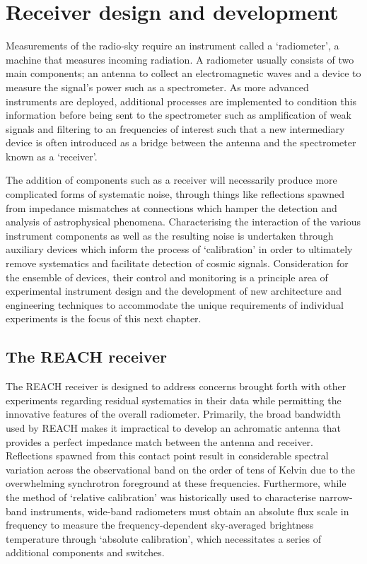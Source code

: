 \chapter{Receiver design and development}

\ifpdf
    \graphicspath{{Chapter3/Figs/Raster/}{Chapter3/Figs/PDF/}{Chapter3/Figs/}}
\else
    \graphicspath{{Chapter3/Figs/Vector/}{Chapter3/Figs/}}
\fi

Measurements of the radio-sky require an instrument called a ‘radiometer’, a machine that measures incoming radiation. A radiometer usually consists of two main components; an antenna to collect an electromagnetic waves and a device to measure the signal's power such as a spectrometer. As more advanced instruments are deployed, additional processes are implemented to condition this information before being sent to the spectrometer such as amplification of weak signals and filtering to an frequencies of interest such that a new intermediary device is often introduced as a bridge between the antenna and the spectrometer known as a ‘receiver’.

The addition of components such as a receiver will necessarily produce more complicated forms of systematic noise, through things like reflections spawned from impedance mismatches at connections which hamper the detection and analysis of astrophysical phenomena. Characterising the interaction of the various instrument components as well as the resulting noise is undertaken through auxiliary devices which inform the process of ‘calibration’ in order to ultimately remove systematics and facilitate detection of cosmic signals. Consideration for the ensemble of devices, their control and monitoring is a principle area of experimental instrument design and the development of new architecture and engineering techniques to accommodate the unique requirements of individual experiments is the focus of this next chapter.


\section{The REACH receiver}
The REACH receiver is designed to address concerns brought forth with other experiments regarding residual systematics in their data while permitting the innovative features of the overall radiometer. Primarily, the broad bandwidth used by REACH makes it impractical to develop an achromatic antenna that provides a perfect impedance match between the antenna and receiver. Reflections spawned from this contact point result in considerable spectral variation across the observational band on the order of tens of Kelvin due to the overwhelming synchrotron foreground at these frequencies. Furthermore, while the method of ‘relative calibration’ was historically used to characterise narrow-band instruments, wide-band radiometers must obtain an absolute flux scale in frequency to measure the frequency-dependent sky-averaged brightness temperature through ‘absolute calibration’, which necessitates a series of additional components and switches.

